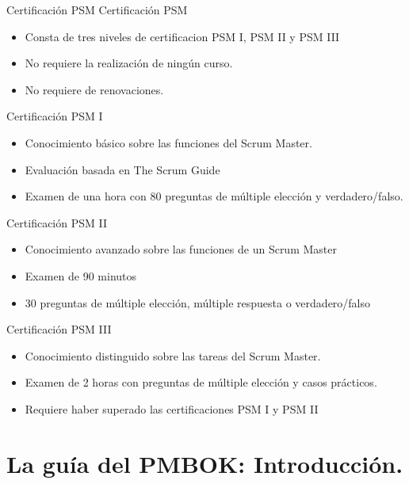 \begin{frame}[allowframebreaks]{Certificación PSM}
	Certificación PSM 

	\begin{itemize}
		\item Consta de tres niveles de certificacion PSM I, PSM II y PSM III
		\item No requiere la realización de ningún curso.
		\item No requiere de renovaciones.
	\end{itemize}

	\framebreak

	Certificación PSM I
	\begin{itemize}
		\item Conocimiento básico sobre las funciones del Scrum Master.
		\item Evaluación basada en The Scrum Guide
		\item Examen de una hora con 80 preguntas de múltiple elección y verdadero/falso.
	\end{itemize}

	\framebreak

	Certificación PSM II
	\begin{itemize}
		\item Conocimiento avanzado sobre las funciones de un Scrum Master
		\item Examen de 90 minutos
		\item 30 preguntas de múltiple elección, múltiple respuesta o verdadero/falso
	\end{itemize}

	\framebreak

	Certificación PSM III
	\begin{itemize}
		\item Conocimiento distinguido sobre las tareas del Scrum Master.
		\item Examen de 2 horas con preguntas de múltiple elección y casos prácticos.
		\item Requiere haber superado las certificaciones PSM I y PSM II
	\end{itemize}


\end{frame}


\section{La guía del PMBOK: Introducción.}

